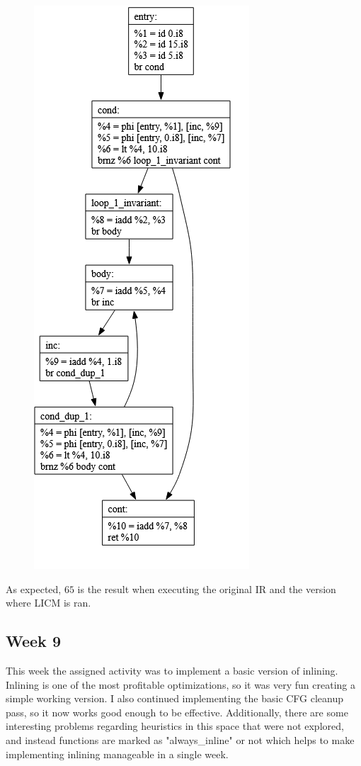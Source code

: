 \documentclass[11pt, a4paper, titlepage]{article}
\begin{document}
\begin{figure}[H]
  \centering
  \includegraphics[scale=0.4]{images/i26.png}
\end{figure}

As expected, $65$ is the result when executing the original IR and the version where LICM is ran.

\subsection{Week 9}

This week the assigned activity was to implement a basic version of inlining.
Inlining is one of the most profitable optimizations, so it was very fun creating a simple working version.
I also continued implementing the basic CFG cleanup pass, so it now works good enough to be effective.
Additionally, there are some interesting problems regarding heuristics in this space that were not explored,
and instead functions are marked as "always\_inline" or not which helps to make implementing inlining manageable in a single week.
\end{document}
